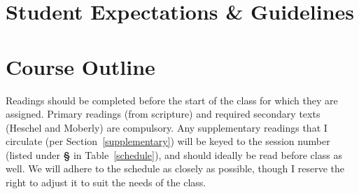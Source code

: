 \documentclass[titlepage]{article}
\newcommand\policy{../policy}
\begin{document}




\section{Student Expectations \& Guidelines}
\label{expectations}







\section{Course Outline}
\label{outline}

Readings should be completed before the start of the class for which
they are assigned. Primary readings (from scripture) and required
secondary texts (Heschel and Moberly) are compulsory. Any supplementary
readings that I circulate (per Section~\ref{supplementary}) will be
keyed to the session number (listed under \textbf{\S} in
Table~\ref{schedule}), and should ideally be read before class as well.
We will adhere to the schedule as closely as possible, though I reserve
the right to adjust it to suit the needs of the class.
\end{document}
